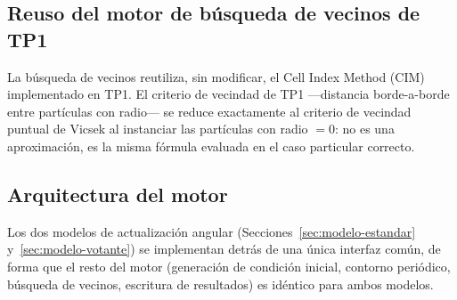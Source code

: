 \documentclass[a4paper,11pt]{article}
\begin{document}
\subsection{Reuso del motor de búsqueda de vecinos de TP1}
\label{sec:reuso-tp1}

La búsqueda de vecinos reutiliza, sin modificar, el Cell Index Method (CIM)
implementado en TP1. El criterio de vecindad de TP1 —distancia borde-a-borde entre
partículas con radio— se reduce exactamente al criterio de vecindad puntual
de Vicsek al instanciar las partículas con radio $=0$: no es una
aproximación, es la misma fórmula evaluada en el caso particular correcto.

\subsection{Arquitectura del motor}

Los dos modelos de actualización angular (Secciones~\ref{sec:modelo-estandar}
y~\ref{sec:modelo-votante}) se implementan detrás de una única interfaz común,
de forma que el resto del motor (generación de condición inicial, contorno
periódico, búsqueda de vecinos, escritura de resultados) es idéntico para
ambos modelos.
\end{document}
